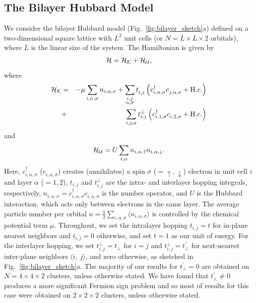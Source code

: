\documentclass[prb,twocolumn,amsmath,amssymb,superscriptaddress,floatfix,nofootinbib]{revtex4-2}
\newcommand{\pdag}{{\phantom\dagger}}
\begin{document}
\subsection{The Bilayer Hubbard Model}
We consider the bilayer Hubbard model (Fig.~\ref{fig:bilayer_sketch}a) defined on a two-dimensional square lattice with $L^2$ unit cells (or $N = L\times L \times 2$ orbitals), where $L$ is the linear size of the system. The Hamiltonian is given by
\begin{eqnarray}
  {\cal H} = {\cal H}_{\cal K} + {\cal H}_{\cal U},
  \label{eq:Hmodel}
\end{eqnarray}
where
\begin{eqnarray}
  {\cal H}_{\cal K}&=&- \mu \sum_{i,\alpha,\sigma} n_{i,\alpha,\sigma} + \sum_{\substack{i,j\nonumber\\ \alpha, \sigma}} 
  t^{\phantom\dagger}_{i,j}\left(c^\dag_{i,\alpha,\sigma} c^\pdag_{j,\alpha,\sigma}  + {\rm H. c.} \right) \\
  &+& \sum_{i,j,\sigma} t^{\perp}_{i,j} \left(c^\dag_{i,1,\sigma} c^\pdag_{i,2,\sigma}  + {\rm H. c.} \right) 
  \label{eq:Hk}
\end{eqnarray}
and
\begin{equation}
  {\cal H}_{\cal U} =  U \sum_{i,\alpha} n_{i,\alpha,\uparrow} n_{i,\alpha,\downarrow}.
  \label{eq:HU}
\end{equation}  
Here, $c^\dag_{i,\alpha,\sigma}$ ($c^\pdag_{i,\alpha,\sigma}$) creates (annihilates) a spin $\sigma$ ($=\uparrow,\downarrow$) electron in unit cell $i$ and layer $\alpha$ ($=1,2$), $t_{i,j}$ and $t^\perp_{i,j}$ are the intra- and interlayer hopping integrals, respectively,  $n^{\phantom\dagger}_{i,\alpha,\sigma} = c^\dag_{i,\alpha,\sigma} c^{\phantom\dagger}_{i,\alpha,\sigma}$ is the number operator, and $U$ is the Hubbard interaction, which acts only between electrons in the same layer. The average particle number per orbital $n = \frac{1}{2}\sum_{i,\alpha,\sigma}\langle n_{i,\alpha,\sigma}\rangle$ is controlled by the chemical potential term $\mu$. Throughout, we set the intralayer hopping  $t_{i,j} = t$ for in-plane nearest neighbors and $t_{i,j} = 0$ otherwise, and set $t = 1$ as our unit of energy. For the interlayer hopping, we set $t^\perp_{i,j} = t_\perp$ for $i = j$ and $t^{\perp}_{i,j} = t_\perp^{\prime}$ for next-nearest inter-plane neighbors $\langle i,~j\rangle$, and zero otherwise, as sketched in Fig.~\ref{fig:bilayer_sketch}a. The majority of our results for $t_\perp^\prime = 0$ are obtained on $N = 4\times 4\times 2$ clusters, unless otherwise stated. We have found that $t^\prime_\perp \ne 0$ produces a more significant Fermion sign problem and so most of results for this case were obtained on $2\times 2\times 2$ clusters, unless otherwise stated. 
\end{document}
